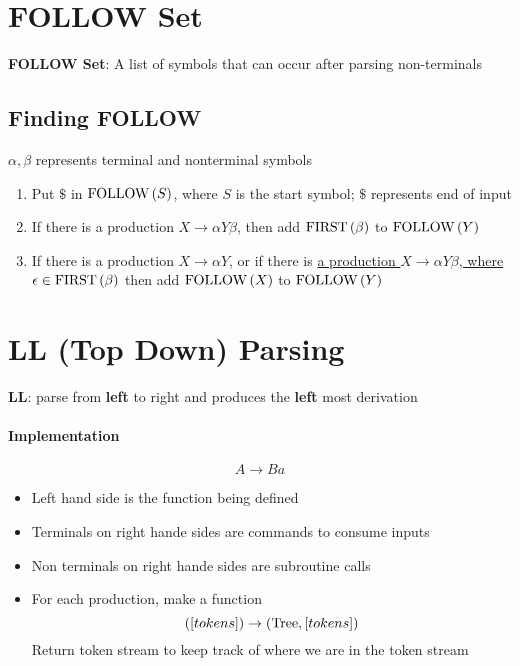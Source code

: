 \section{FOLLOW Set}

  \begin{definition}
    \textbf{FOLLOW Set}: A list of symbols that can occur after parsing
    non-terminals
  \end{definition}

  \subsection{Finding FOLLOW}

    $ \alpha, \beta $ represents terminal and nonterminal symbols

    \begin{enumerate}
      \item Put $ \$ $ in $ \operatorname{FOLLOW}\left( S \right) $, where $ S $ is the start
      symbol; $ \$ $ represents end of input
      \item If there is a production $ X \to \alpha Y \beta $, then add
      $ \operatorname{FIRST}\left( \beta \right) $ to $ \operatorname{FOLLOW}\left( Y \right) $
      \item If there is a production $ X \to \alpha Y $, or if there is \ul{a
      production $ X \to \alpha Y \beta $, where
      $ \epsilon \in \operatorname{FIRST}\left( \beta \right) $} then add
      $ \operatorname{FOLLOW}\left( X \right) $ to $ \operatorname{FOLLOW}\left( Y \right) $
    \end{enumerate}

\section{LL (Top Down) Parsing}

  \begin{definition}
    \textbf{LL}: parse from \textbf{left} to right and produces the
    \textbf{left} most derivation
  \end{definition}

  \paragraph{Implementation}
  \begin{equation*}
    A \to B a
  \end{equation*}
  \begin{itemize}
    \item Left hand side is the function being defined
    \item Terminals on right hande sides are commands to consume inputs
    \item Non terminals on right hande sides are subroutine calls
    \item For each production, make a function
    \begin{equation*}
      \left( \left[ tokens \right] \right) \to
      \left( \operatorname{Tree}, \left[ tokens \right] \right)
    \end{equation*}
    Return token stream to keep track of where we are in the token stream
  \end{itemize}


